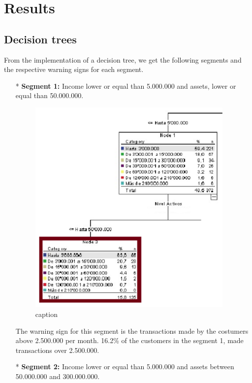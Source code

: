 \chapter{Results}
\label{chap:results}
\section{Decision trees}
From the implementation of a decision tree, we get the following segments and the respective warning signs for each segment.
\begin{itemize}
\item[*] \textbf{Segment 1:}
Income lower or equal than 5.000.000 and assets, lower or equal than 50.000.000.

\begin{figure}[htbp]
  \centering
  \includegraphics[width=0.95\textwidth]{Segmento1}
  \caption{caption}
  \label{fig:label}
\end{figure}

The warning sign for this segment is the transactions made by the costumers above 2.500.000 per month.  16.2\% of the customers in the segment 1, made transactions over 2.500.000.
\item[*] \textbf{Segment 2:}
Income lower or equal than 5.000.000 and assets between 50.000.000 and 300.000.000.


\end{itemize}
